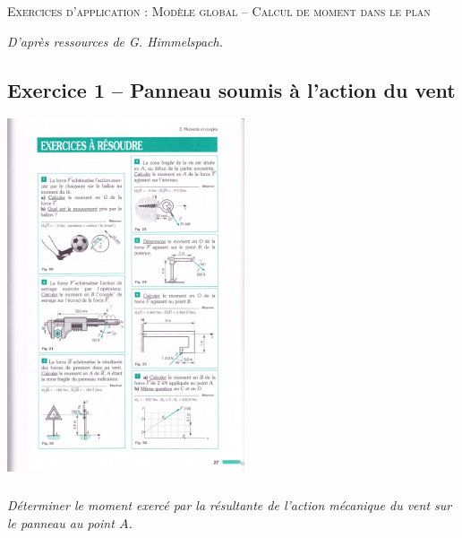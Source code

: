 \documentclass[10pt]{article}
\begin{document}

\begin{center}
\Large{\textsc{Exercices d'application : Modèle global -- Calcul de moment dans le plan}}
\end{center}

\begin{flushright}
\textit{D'après ressources de G. Himmelspach.}
\end{flushright}
\vspace{.5cm}

\subsection*{Exercice 1 -- Panneau soumis à l'action du vent}
\setcounter{subparagraph}{0}

\begin{center}
\includegraphics[width=7cm]{images/moment8.pdf}
\end{center}

\subparagraph*{}
\textit{Déterminer le moment exercé par la résultante de l'action mécanique du vent sur le panneau au point $A$.}
\end{document}
